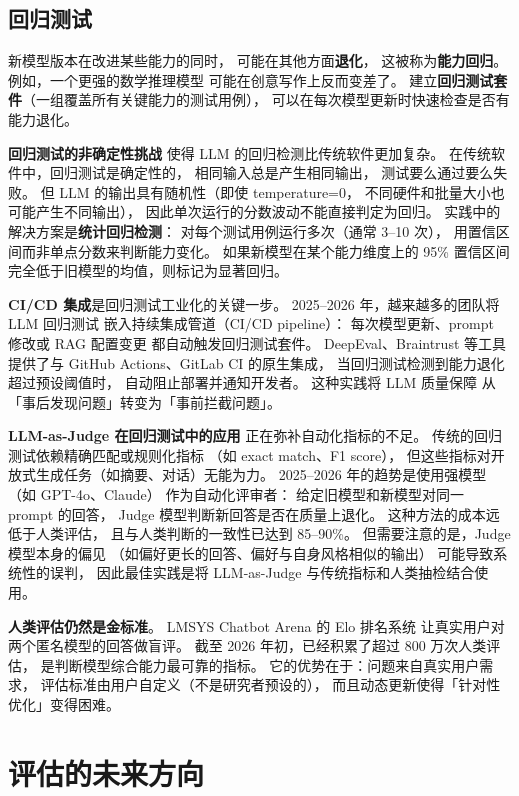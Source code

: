 \subsection{回归测试}

新模型版本在改进某些能力的同时，
可能在其他方面\textbf{退化}，
这被称为\textbf{能力回归}。
例如，一个更强的数学推理模型
可能在创意写作上反而变差了。
建立\textbf{回归测试套件}（一组覆盖所有关键能力的测试用例），
可以在每次模型更新时快速检查是否有能力退化。

\textbf{回归测试的非确定性挑战}
使得 LLM 的回归检测比传统软件更加复杂。
在传统软件中，回归测试是确定性的，
相同输入总是产生相同输出，
测试要么通过要么失败。
但 LLM 的输出具有随机性（即使 temperature=0，
不同硬件和批量大小也可能产生不同输出），
因此单次运行的分数波动不能直接判定为回归。
实践中的解决方案是\textbf{统计回归检测}：
对每个测试用例运行多次（通常 3--10 次），
用置信区间而非单点分数来判断能力变化。
如果新模型在某个能力维度上的 95\% 置信区间
完全低于旧模型的均值，则标记为显著回归。

\textbf{CI/CD 集成}是回归测试工业化的关键一步。
2025--2026 年，越来越多的团队将 LLM 回归测试
嵌入持续集成管道（CI/CD pipeline）：
每次模型更新、prompt 修改或 RAG 配置变更
都自动触发回归测试套件。
DeepEval、Braintrust 等工具
提供了与 GitHub Actions、GitLab CI 的原生集成，
当回归测试检测到能力退化超过预设阈值时，
自动阻止部署并通知开发者。
这种实践将 LLM 质量保障
从「事后发现问题」转变为「事前拦截问题」。

\textbf{LLM-as-Judge 在回归测试中的应用}
正在弥补自动化指标的不足。
传统的回归测试依赖精确匹配或规则化指标
（如 exact match、F1 score），
但这些指标对开放式生成任务（如摘要、对话）无能为力。
2025--2026 年的趋势是使用强模型（如 GPT-4o、Claude）
作为自动化评审者：
给定旧模型和新模型对同一 prompt 的回答，
Judge 模型判断新回答是否在质量上退化。
这种方法的成本远低于人类评估，
且与人类判断的一致性已达到 85--90\%。
但需要注意的是，Judge 模型本身的偏见
（如偏好更长的回答、偏好与自身风格相似的输出）
可能导致系统性的误判，
因此最佳实践是将 LLM-as-Judge
与传统指标和人类抽检结合使用。

\textbf{人类评估仍然是金标准}。
LMSYS Chatbot Arena 的 Elo 排名系统
让真实用户对两个匿名模型的回答做盲评。
截至 2026 年初，已经积累了超过 800 万次人类评估，
是判断模型综合能力最可靠的指标。
它的优势在于：问题来自真实用户需求，
评估标准由用户自定义（不是研究者预设的），
而且动态更新使得「针对性优化」变得困难。

\section{评估的未来方向}
\label{sec:eval-future}

